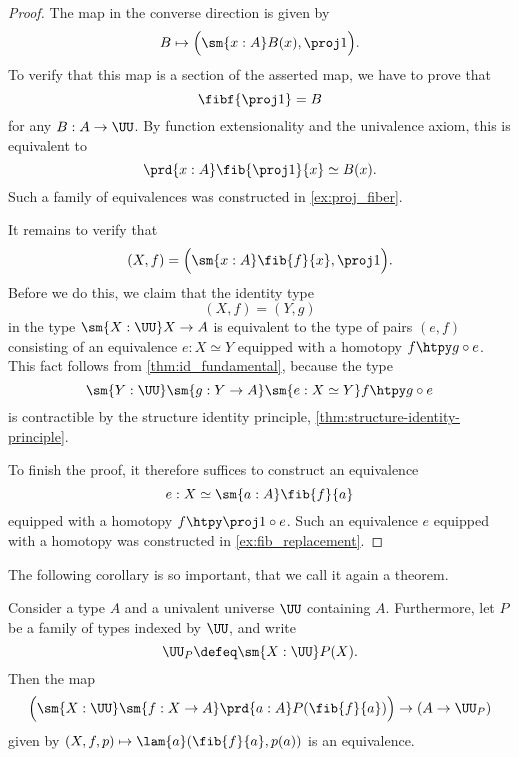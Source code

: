 \begin{proof}
  The map in the converse direction is given by
  \begin{equation*}
    B\mapsto \Big(\sm{x:A}B(x),\proj 1\Big). 
  \end{equation*}
  To verify that this map is a section of the asserted map, we have to prove that
  \begin{equation*}
    \fibf{\proj 1}=B
  \end{equation*}
  for any $B:A\to\UU$. By function extensionality and the univalence axiom, this is equivalent to
  \begin{equation*}
    \prd{x:A}\fib{\proj 1}{x}\simeq B(x).
  \end{equation*}
  Such a family of equivalences was constructed in \cref{ex:proj_fiber}.

  It remains to verify that
  \begin{equation*}
    (X,f)=\Big(\sm{x:A}\fib{f}{x},\proj 1\Big). 
  \end{equation*}
  Before we do this, we claim that the identity type
  \begin{equation*}
    (X,f)=(Y,g)
  \end{equation*}
  in the type $\sm{X:\UU}X\to A$ is equivalent to the type of pairs $(e,f)$ consisting of an equivalence $e:X\simeq Y$ equipped with a homotopy $f\htpy g\circ e$. This fact follows from \cref{thm:id_fundamental}, because the type
  \begin{equation*}
    \sm{Y:\UU}\sm{g:Y\to A}\sm{e:X\simeq Y}f\htpy g\circ e
  \end{equation*}
  is contractible by the structure identity principle, \cref{thm:structure-identity-principle}.

  To finish the proof, it therefore suffices to construct an equivalence
  \begin{equation*}
    e:X\simeq \sm{a:A}\fib{f}{a}
  \end{equation*}
  equipped with a homotopy $f\htpy \proj 1\circ e$. Such an equivalence $e$ equipped with a homotopy was constructed in \cref{ex:fib_replacement}.
\end{proof}

The following corollary is so important, that we call it again a theorem.

\begin{thm}\label{thm:classifier-subuniverse}
  Consider a type $A$ and a univalent universe $\UU$ containing $A$. Furthermore, let $P$ be a family of types indexed by $\UU$, and write
  \begin{equation*}
    \UU_P\defeq\sm{X:\UU}P(X).
  \end{equation*}
  Then the map
  \begin{equation*}
    \Big(\sm{X:\UU}\sm{f:X\to A}\prd{a:A}P(\fib{f}{a})\Big)\to (A\to\UU_P)
  \end{equation*}
  given by $(X,f,p)\mapsto \lam{a}(\fib{f}{a},p(a))$ is an equivalence.
\end{thm}

